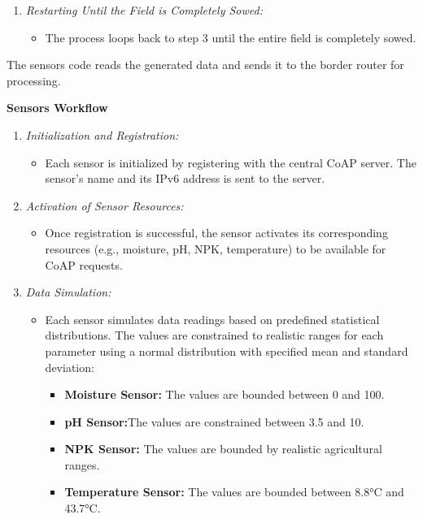 \begin{enumerate}
    \item \textit{Restarting Until the Field is Completely Sowed:}
    \begin{itemize}
        \item The process loops back to step 3 until the entire field is completely sowed.
    \end{itemize}
    
\end{enumerate}

\newpage


The sensors code reads the generated data and sends it to the border router for processing.


\textbf{Sensors Workflow}

\begin{enumerate}
    \item \textit{Initialization and Registration:}
    \begin{itemize}
        \item Each sensor is initialized by registering with the central CoAP server. The sensor's name and its IPv6 address is sent to the server.
    \end{itemize}

    \item \textit{Activation of Sensor Resources:}
    \begin{itemize}
        \item Once registration is successful, the sensor activates its corresponding resources (e.g., moisture, pH, NPK, temperature) to be available for CoAP requests.
    \end{itemize}
    
    \item \textit{Data Simulation:}
    \begin{itemize}
        \item Each sensor simulates data readings based on predefined statistical distributions. The values are constrained to realistic ranges for each parameter using a normal distribution with specified mean and standard deviation:
        \begin{itemize}
            \item \textbf{Moisture Sensor:} The values are bounded between 0 and 100.
            \item \textbf{pH Sensor:}The values are constrained between 3.5 and 10.
            \item \textbf{NPK Sensor:} The values are bounded by realistic agricultural ranges.
            \item \textbf{Temperature Sensor:} The values are bounded between 8.8°C and 43.7°C.
        \end{itemize}
    \end{itemize}
    

\end{enumerate}

